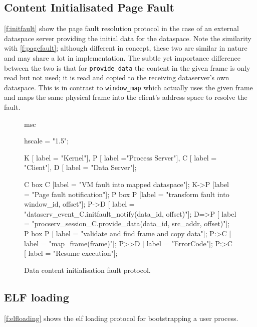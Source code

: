 \clearpage
\subsection{Content Initialisated Page Fault}

\autoref{f:initfault} show the page fault resolution protocol in the case of an external dataspace
server providing the initial data for the dataspace. Note the similarity with \autoref{f:pagefault};
although different in concept, these two are similar in nature and may share a lot in
implementation. The subtle yet importance difference between the two is that for
\texttt{provide\_data} the content in the given frame is only read but not used; it is read and
copied to the receiving dataserver's own dataspace. This is in contrast to \texttt{window\_map}
which actually uses the given frame and maps the same physical frame into the client's address space
to resolve the fault.

\begin{figure}[htb]
  \begin{center}
    \begin{msc}
      msc {
        hscale = "1.5";
        
        K [ label = "Kernel"],
        P [ label ="Process Server"],
        C [ label = "Client"],
        D [ label = "Data Server"];
        
        C box C [label = "VM fault into mapped dataspace"];
        K->P [label = "Page fault notification"];
        P box P [label = "transform fault into window\_id, offset"];
        P->D [ label = "dataserv\_event\_C.initfault\_notify(data\_id, offset)"];
        D=>P [ label = "procserv\_session\_C.provide\_data(data\_id, src\_addr, offset)"];
        P box P [ label = "validate and find frame and copy data"];
        P:>C [ label = "map\_frame(frame)"];
        P>>D [ label = "ErrorCode"];
        P:>C [ label = "Resume execution"];
      }
    \end{msc}
  \end{center}
  \caption{Data content initialisation fault protocol.}
  \label{f:initfault}
\end{figure}

\subsection{ELF loading}

\autoref{f:elfloading} shows the elf loading protocol for bootstrapping a user process.

